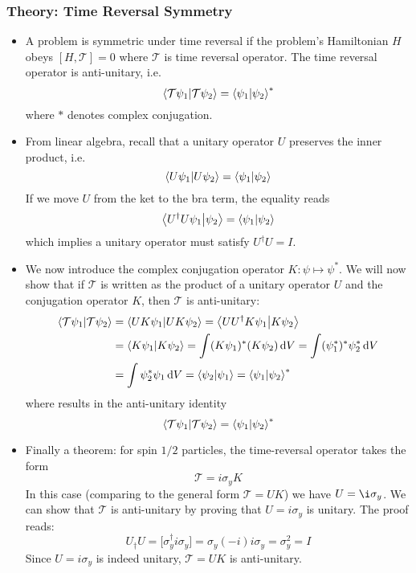 \documentclass[11pt, a4paper]{article}
\newcommand{\diff}{\mathop{}\!\mathrm{d}} %
\newcommand{\T}{\mathcal{T}}  %
\newcommand{\bbraket}[2]{\big \langle {#1} \big | {#2} \big \rangle}  %
\begin{document}
\subsubsection{Theory: Time Reversal Symmetry}
\begin{itemize}
	\item A problem is symmetric under time reversal if the problem's Hamiltonian $ H $ obeys $ [H, \T] = 0 $ where $ \T $ is time reversal operator. The time reversal operator is anti-unitary, i.e.
	\begin{equation*}
		\braket{\T\psi_{1}}{\T\psi_{2}} = \braket{\psi_{1}}{\psi_{2}}^{*}
	\end{equation*}
	where $ * $ denotes complex conjugation.
	
	\item From linear algebra, recall that a unitary operator $ U $ preserves the inner product, i.e.
	\begin{equation*}
		\braket{U\psi_{1}}{U\psi_{2}} = \braket{\psi_{1}}{\psi_{2}} 
	\end{equation*}
	If we move $ U $ from the ket to the bra term, the equality reads
	\begin{equation*}
		\bbraket{U^{\dagger}U\psi_{1}}{\psi_{2}} = \braket{\psi_{1}}{\psi_{2}} 
	\end{equation*}
	which implies a unitary operator must satisfy $ U^{\dagger}U = I $.
	
	\item We now introduce the complex conjugation operator $ K: \psi \mapsto \psi^{*} $. We will now show that if $ \T $ is written as the product of a unitary operator $ U $ and the conjugation operator $ K $, then $ \T $ is anti-unitary:
	\begin{align*}
		\braket{\T\psi_{1}}{\T\psi_{2}} &= \braket{UK\psi_{1}}{UK\psi_{2}} = \bbraket{UU^{\dagger}K\psi_{1}}{K\psi_{2}}\\
		&= \braket{K\psi_{1}}{K\psi_{2}} = \int (K\psi_{1})^{*} (K\psi_{2})\diff V = \int (\psi_{1}^{*})^{*}\psi_{2}^{*}\diff V\\
		&= \int \psi_{2}^{*}\psi_{1}\diff V = \braket{\psi_{2}}{\psi_{1}} = \braket{\psi_{1}}{\psi_{2}}^{*}
	\end{align*}
	where results in the anti-unitary identity 
	\begin{equation*}
		\braket{\T\psi_{1}}{\T\psi_{2}} = \braket{\psi_{1}}{\psi_{2}}^{*}
	\end{equation*}
	
	\item Finally a theorem: for spin $ 1/2 $ particles, the time-reversal operator takes the form
	\begin{equation*}
		\T = i\sigma_{y}K
	\end{equation*}
	In this case (comparing to the general form $ \T = UK $) we have $ U = \i \sigma_{y} $. We can show that $ \T $ is anti-unitary by proving that $ U = i \sigma_{y} $ is unitary. The proof reads:
	\begin{equation*}
		U_{\dagger}U = \big[\sigma_{y}^{\dagger} i \sigma_{y}\big] = \sigma_{y} (-i) i \sigma_{y} = \sigma_{y}^{2} = I
	\end{equation*}
	Since $ U = i \sigma_{y} $ is indeed unitary, $ \T = UK $ is anti-unitary.
\end{itemize}
\end{document}
